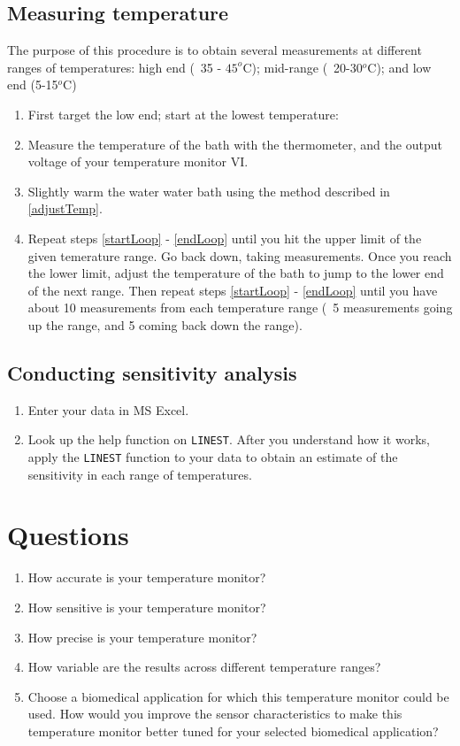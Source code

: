 \documentclass[12pt,oneside]{article}
\begin{document}
\subsection{Measuring temperature}\label{measureTemp}
The purpose of this procedure is to obtain several measurements at different ranges of temperatures: high end (~35 - $45^o$C); mid-range (~20-30$^o$C); and low end (5-15$^o$C) 
\begin{enumerate}
\item First target the low end; start at the lowest temperature: 
\item \label{startLoop} Measure the temperature of the bath with the thermometer, and the output voltage of your temperature monitor VI.
\item \label{endLoop} Slightly warm the water water bath using the method described in \ref{adjustTemp}.
\item Repeat steps \ref{startLoop} - \ref{endLoop} until you hit the upper limit of the given temerature range. Go back down, taking measurements.  Once you reach the lower limit, adjust the temperature of the bath to jump to the lower end of the next range. Then repeat  steps \ref{startLoop} - \ref{endLoop} until you have about 10 measurements from each temperature range (~5 measurements going up the range, and 5 coming back down the range).
\end{enumerate}

\subsection{Conducting sensitivity analysis}%
\begin{enumerate}
\item Enter your data in MS Excel.
\item Look up the help function on {\tt LINEST}.  After you understand how it works, apply the {\tt LINEST} function to your data to obtain an estimate of the sensitivity in each range of temperatures.  %
\end{enumerate}

\section{Questions}
\begin{enumerate}
\item How accurate is your temperature monitor? 
\item How sensitive is your temperature monitor? 
\item How precise is your temperature monitor?
\item How variable are the results across different temperature ranges?
\item Choose a biomedical application for which this temperature monitor could be used. How would you improve the sensor characteristics to make this temperature monitor better tuned for your selected biomedical application?
\end{enumerate}
\end{document}
